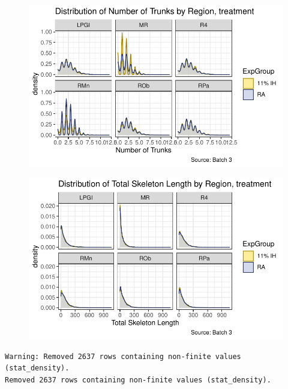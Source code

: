 \documentclass[
  12pt,
  letterpaper,
  DIV=11,
  numbers=noendperiod]{scrartcl}
\begin{document}
\begin{figure}[H]

{\centering \includegraphics{Fiber_analysis_quarto_files/figure-pdf/make_distribution_plots_region-3.pdf}

}

\end{figure}

\begin{figure}[H]

{\centering \includegraphics{Fiber_analysis_quarto_files/figure-pdf/make_distribution_plots_region-4.pdf}

}

\end{figure}

\begin{verbatim}
Warning: Removed 2637 rows containing non-finite values (stat_density).
Removed 2637 rows containing non-finite values (stat_density).
\end{verbatim}
\end{document}
